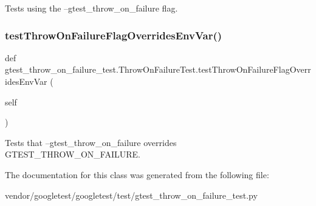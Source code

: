 \begin{DoxyVerb}Tests using the --gtest_throw_on_failure flag.\end{DoxyVerb}
 \mbox{\label{classgtest__throw__on__failure__test_1_1_throw_on_failure_test_ab63f8f491aeaaa04ba3fc7ae3bca6de8}} 
\subsubsection{\texorpdfstring{test\+Throw\+On\+Failure\+Flag\+Overrides\+Env\+Var()}{testThrowOnFailureFlagOverridesEnvVar()}}
{\footnotesize\ttfamily def gtest\+\_\+throw\+\_\+on\+\_\+failure\+\_\+test.\+Throw\+On\+Failure\+Test.\+test\+Throw\+On\+Failure\+Flag\+Overrides\+Env\+Var (\begin{DoxyParamCaption}\item[{}]{self }\end{DoxyParamCaption})}

\begin{DoxyVerb}Tests that --gtest_throw_on_failure overrides GTEST_THROW_ON_FAILURE.\end{DoxyVerb}
 

The documentation for this class was generated from the following file\+:\begin{DoxyCompactItemize}
\item 
vendor/googletest/googletest/test/gtest\+\_\+throw\+\_\+on\+\_\+failure\+\_\+test.\+py\end{DoxyCompactItemize}
